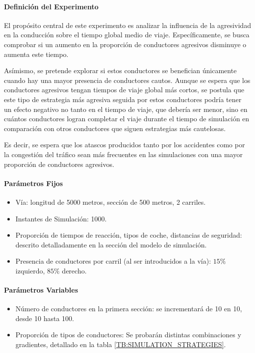 \paragraph{Definición del Experimento}
El propósito central de este experimento es analizar la influencia de la agresividad en la conducción sobre el tiempo global medio de viaje.
Específicamente, se busca comprobar si un aumento en la proporción de conductores agresivos disminuye o aumenta este tiempo.

Asímismo, se pretende explorar si estos conductores se benefician únicamente cuando hay una mayor presencia de conductores cautos.
Aunque se espera que los conductores agresivos tengan tiempos de viaje global más cortos,
se postula que este tipo de estrategia más agresiva seguida por estos conductores podría tener un efecto negativo no tanto en el tiempo de viaje,
que debería ser menor, sino en cuántos conductores logran completar el viaje durante el tiempo de simulación en comparación con otros conductores
que siguen estrategias más cautelosas.

Es decir, se espera que los atascos producidos tanto por los accidentes como por la congestión del tráfico
sean más frecuentes en las simulaciones con una mayor proporción de conductores agresivos.

\paragraph{Parámetros Fijos}
\begin{itemize}
    \item Vía: longitud de 5000 metros, sección de 500 metros, 2 carriles.
    \item Instantes de Simulación: 1000.
    \item Proporción de tiempos de reacción, tipos de coche, distancias de seguridad: descrito detalladamente en la sección del modelo de simulación.
    \item Presencia de conductores por carril (al ser introducidos a la vía): $15\%$ izquierdo, $85\%$ derecho.
\end{itemize}

\paragraph{Parámetros Variables}
\begin{itemize}
    \item Número de conductores en la primera sección: se incrementará de 10 en 10, desde 10 hasta 100.
    \item Proporción de tipos de conductores: Se probarán distintas combinaciones y gradientes, detallado en la tabla \ref{TB:SIMULATION_STRATEGIES}.
\end{itemize}

